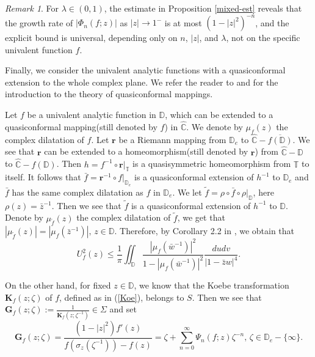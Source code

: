 \documentclass[10pt]{amsart}
\theoremstyle{definition}
\theoremstyle{remark}
\newtheorem{remark}[theorem]{Remark}
\numberwithin{equation}{section}
\begin{document}
\begin{remark}
For $\lambda\in(0,1)$, the estimate in Proposition \ref{mixed-est} reveals that the growth rate of $|\Phi_n(f;z)|$ as $|z|\to 1^-$ is at most $(1-|z|^2)^{-n}$, and the explicit bound is universal, depending only on $n$, $|z|$, and $\lambda$, not on the specific univalent function $f$.
\end{remark}
 Finally, we consider the univalent analytic functions with a quasiconformal extension to the whole complex plane.  We refer the reader to \cite{LV} and \cite{L} for the introduction to the theory of quasiconformal mappings.  
 
Let $f$ be a univalent analytic function in $\mathbb{D}$, which can be  extended to a quasiconformal mapping(still denoted by $f$) in $\widehat{\mathbb{C}}$. We denote by $\mu_f(z)$ the complex dilatation of $f$.  Let $\mathbf{r}$ be a Riemann mapping from $\mathbb{D}_e$ to $\widehat{\mathbb{C}}-\overline{ f(\mathbb{D})}$. We see that $\mathbf{r}$ can be extended to a homeomorphism(still denoted by $\mathbf{r}$) from $\widehat{\mathbb{C}}-\mathbb{D}$ to $\widehat{\mathbb{C}}-f(\mathbb{D})$. Then $h=f^{-1}\circ \mathbf{r}|_{\mathbb{T}}$ is a quasisymmetric homeomorphism from $\mathbb{T}$ to itself.  It follows that $\bar{f}=\mathbf{r}^{-1}\circ f|_{\mathbb{D}_e}$ is a quasiconformal extension of $h^{-1}$
to $\mathbb{D}_e$ and $\bar{f}$ has the same complex dilatation as $f$ in $\mathbb{D}_e$.  We let $\tilde{f}=\rho \circ \bar{f} \circ \rho|_{\mathbb{D}}$, here $\rho(z)={\bar{z}}^{-1}$.
Then we see that $\tilde{f}$ is a quasiconformal extension of $h^{-1}$ to $\mathbb{D}$. Denote by $\mu_{\tilde{f}}(z)$ the complex dilatation of $\tilde{f}$, we get that 
$|\mu_{\tilde{f}}(z)|=|\mu_f({\bar{z}}^{-1})|, \, z\in \mathbb{D}$. Therefore, by Corollary 2.2 in \cite{SW}, we obtain that
\begin{equation}\label{ine-l}
U_f^2(z)\leq \frac{1}{\pi}\iint_{\mathbb{D}} \frac{|\mu_{f}({\bar{w}}^{-1})|^2}{1-|\mu_f({\bar{w}}^{-1})|^2}\frac{dudv}{|1-\bar{z}w|^4}.
\end{equation}

On the other hand, for fixed $z\in \mathbb{D}$, we know that the Koebe transformation $\mathbf{K}_{f}(z; \zeta)$ of ${f} $,  defined as in (\ref{Koe}), belongs to $S$. Then we see that $\mathbf{G}_{f}(z; \zeta):=\frac{1}{\mathbf{K}_{f}(z; \zeta^{-1})} \in \Sigma$ and set 
\begin{equation}\label{last-1}
\mathbf{G}_{f}(z; \zeta)=\frac{(1-|z|^2){f}'(z)}{f\left(\sigma_{z}(\zeta^{-1})\right)-{f}(z)} =\zeta+\sum_{n=0}^{\infty}\Psi_n({f}; z)\zeta^{-n}, \, \zeta \in \mathbb{D}_e-\{\infty\}.
\end{equation}
\end{document}
